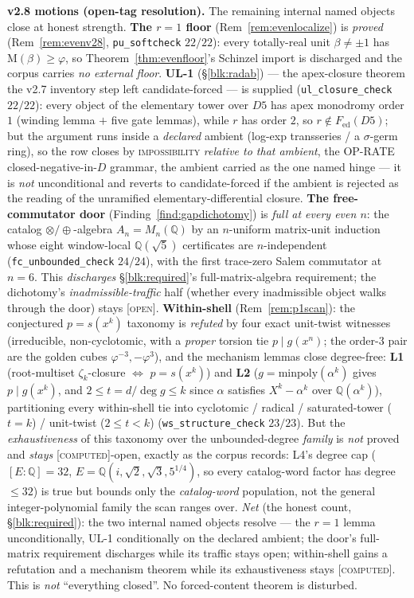 \documentclass[11pt]{article}
\newcommand{\tagC}{\textcolor{cC}{\textsc{[computed]}}}
\newcommand{\tagO}{\textcolor{cO}{\textsc{[open]}}}
\newcommand{\Q}{\mathbb{Q}}
\newcommand{\gp}{\varphi}
\newcommand{\M}{\mathrm{M}}
\theoremstyle{plain}
\theoremstyle{definition}
\theoremstyle{remark}
\begin{document}
\smallskip\noindent
\textbf{v2.8 motions (open-tag resolution).} The remaining internal named objects
close at honest strength. \textbf{The $r=1$ floor} (Rem~\ref{rem:evenlocalize}) is
\emph{proved} (Rem~\ref{rem:evenv28}, \texttt{pu\_softcheck} $22/22$): every
totally-real unit $\beta\ne\pm1$ has $\M(\beta)\ge\gp$, so
Theorem~\ref{thm:evenfloor}'s Schinzel import is discharged and the corpus carries
\emph{no external floor}. \textbf{UL-1} (\S\ref{blk:radab}) --- the apex-closure
theorem the v2.7 inventory step left candidate-forced --- is supplied
(\texttt{ul\_closure\_check} $22/22$): every object of the elementary tower over $D5$
has apex monodromy order $1$ (winding lemma $+$ five gate lemmas), while $r$ has
order $2$, so $r\notin F_{\mathrm{ed}}(D5)$; but the argument runs inside a
\emph{declared} ambient (log-exp transseries / a $\sigma$-germ ring), so the row
closes by \textsc{impossibility} \emph{relative to that ambient}, the OP-RATE
closed-negative-in-$D$ grammar, the ambient carried as the one named hinge --- it is
\emph{not} unconditional and reverts to candidate-forced if the ambient is rejected
as the reading of the unramified elementary-differential closure.
\textbf{The free-commutator door} (Finding~\ref{find:gapdichotomy}) is \emph{full at
every even $n$}: the catalog $\otimes/\oplus$-algebra $A_n=M_n(\Q)$ by an $n$-uniform
matrix-unit induction whose eight window-local $\Q(\sqrt5)$ certificates are
$n$-independent (\texttt{fc\_unbounded\_check} $24/24$), with the first trace-zero
Salem commutator at $n=6$. This \emph{discharges} \S\ref{blk:required}'s
full-matrix-algebra requirement; the dichotomy's \emph{inadmissible-traffic} half
(whether every inadmissible object walks through the door) stays \tagO{}.
\textbf{Within-shell} (Rem~\ref{rem:p1scan}): the conjectured $p=s(x^k)$ taxonomy is
\emph{refuted} by four exact unit-twist witnesses (irreducible, non-cyclotomic, with
a \emph{proper} torsion tie $p\mid g(x^n)$; the order-$3$ pair are the golden cubes
$\gp^{-3},-\gp^3$), and the mechanism lemmas close degree-free: \textbf{L1}
(root-multiset $\zeta_k$-closure $\iff$ $p=s(x^k)$) and \textbf{L2}
($g=\mathrm{minpoly}(\alpha^k)$ gives $p\mid g(x^k)$, and $2\le t=d/\deg g\le k$ since
$\alpha$ satisfies $X^k-\alpha^k$ over $\Q(\alpha^k)$), partitioning every
within-shell tie into cyclotomic / radical / saturated-tower ($t=k$) / unit-twist
($2\le t<k$) (\texttt{ws\_structure\_check} $23/23$). But the \emph{exhaustiveness} of
this taxonomy over the unbounded-degree \emph{family} is \emph{not} proved and
\emph{stays} \tagC{}-open, exactly as the corpus records: L4's degree cap
($[E:\Q]=32$, $E=\Q(i,\sqrt2,\sqrt3,5^{1/4})$, so every catalog-word factor has degree
$\le32$) is true but bounds only the \emph{catalog-word} population, not the general
integer-polynomial family the scan ranges over. \emph{Net} (the honest count,
\S\ref{blk:required}): the two internal named objects resolve --- the $r=1$ lemma
unconditionally, UL-1 conditionally on the declared ambient; the door's
full-matrix requirement discharges while its traffic stays open; within-shell gains a
refutation and a mechanism theorem while its exhaustiveness stays \tagC{}. This is
\emph{not} ``everything closed''. No forced-content theorem is disturbed.
\end{document}
